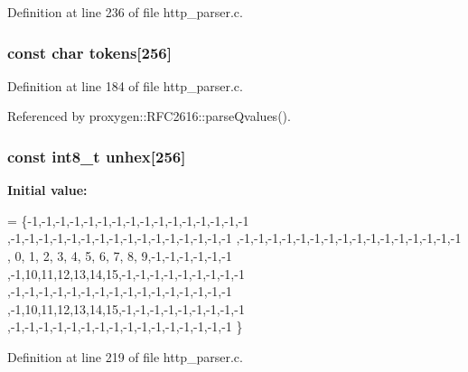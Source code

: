 Definition at line 236 of file http\+\_\+parser.\+c.

\subsubsection[{tokens}]{\setlength{\rightskip}{0pt plus 5cm}const char tokens[256]\hspace{0.3cm}{\ttfamily [static]}}\label{http__parser_8c_a4e5747065ed2d7b90f2d8a148c88b55b}


Definition at line 184 of file http\+\_\+parser.\+c.



Referenced by proxygen\+::\+R\+F\+C2616\+::parse\+Qvalues().

\subsubsection[{unhex}]{\setlength{\rightskip}{0pt plus 5cm}const int8\+\_\+t unhex[256]\hspace{0.3cm}{\ttfamily [static]}}\label{http__parser_8c_a50ac0fd18703512ac28f2da3a65a84b6}
{\bfseries Initial value\+:}
\begin{DoxyCode}
=
  \{-1,-1,-1,-1,-1,-1,-1,-1,-1,-1,-1,-1,-1,-1,-1,-1
  ,-1,-1,-1,-1,-1,-1,-1,-1,-1,-1,-1,-1,-1,-1,-1,-1
  ,-1,-1,-1,-1,-1,-1,-1,-1,-1,-1,-1,-1,-1,-1,-1,-1
  , 0, 1, 2, 3, 4, 5, 6, 7, 8, 9,-1,-1,-1,-1,-1,-1
  ,-1,10,11,12,13,14,15,-1,-1,-1,-1,-1,-1,-1,-1,-1
  ,-1,-1,-1,-1,-1,-1,-1,-1,-1,-1,-1,-1,-1,-1,-1,-1
  ,-1,10,11,12,13,14,15,-1,-1,-1,-1,-1,-1,-1,-1,-1
  ,-1,-1,-1,-1,-1,-1,-1,-1,-1,-1,-1,-1,-1,-1,-1,-1
  \}
\end{DoxyCode}


Definition at line 219 of file http\+\_\+parser.\+c.

